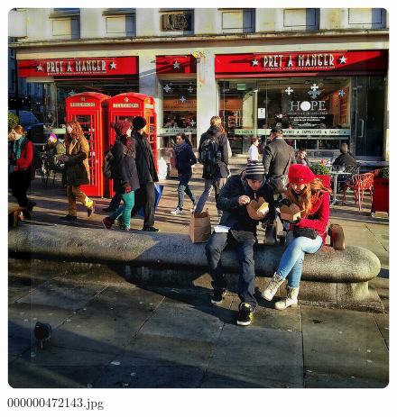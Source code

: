 \begin{figure}[h]
    \centering
    \includegraphics[width=0.8\linewidth]{../image set/hard/000000472143.jpg}
    \caption{000000472143.jpg}
\end{figure}

